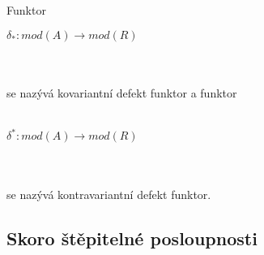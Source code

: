      \begin{dfn}
       Funktor \\
       \centerline{$\delta_*:mod(A)\rightarrow mod(R)$}\\\\
       se nazývá kovariantní defekt funktor a funktor  \\\\
       \centerline{$\delta^*:mod(A)\rightarrow mod(R)$} \\\\ 
       se nazývá kontravariantní defekt funktor.
     \end{dfn}
     
  \subsection{Skoro štěpitelné posloupnosti}
     
